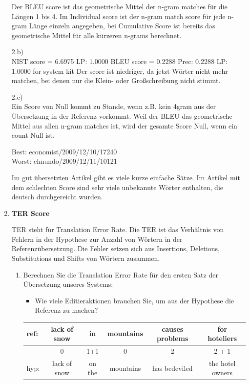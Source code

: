 \documentclass[12pt,fleqn]{article}
\begin{document}
\begin{enumerate}
Der BLEU score ist das geometrische Mittel der n-gram matches für die Längen 1 bis 4.
Im Individual score ist der n-gram match score für jede n-gram Länge einzeln angegeben, bei Cumulative Score ist bereits das geometrische Mittel für alle kürzeren n-grams berechnet.

\vspace{0.5cm} 
2.b) \\
NIST score = 6.6975 LP: 1.0000 BLEU score = 0.2288 Prec: 0.2288 LP: 1.0000 for system kit
Der score ist niedriger, da jetzt Wörter nicht mehr matchen, bei denen nur die Klein- oder Großschreibung nicht stimmt.

\vspace{0.5cm} 
2.c)\\
Ein Score von Null kommt zu Stande, wenn z.B. kein 4gram aus der Übersetzung in der Referenz vorkommt. Weil der BLEU das geometrische Mittel aus allen n-gram matches ist, wird der gesamte Score Null, wenn ein count Null ist.

Best:    economist/2009/12/10/17240 \\
Worst:  elmundo/2009/12/11/10121

Im gut übersetzten Artikel gibt es viele kurze einfache Sätze.
Im Artikel mit dem schlechten Score sind sehr viele unbekannte Wörter enthalten, die deutsch durchgereicht wurden. 


\vspace{0.5cm} 
\item \textbf{TER Score} 

\vspace{0.5cm} 
TER steht für Translation Error Rate. Die TER ist das Verhältnis von Fehlern in der Hypothese zur Anzahl von Wörtern in der Referenzübersetzung. Die Fehler setzen sich aus Insertions, Deletions, Substitutions und Shifts von Wörtern zusammen.

\vspace{0.5cm} 
\begin{enumerate} 
\item Berechnen Sie die Translation Error Rate für den ersten Satz der Übersetzung unseres Systems:


\vspace{0.5cm} 
\begin{itemize} 
 \item Wie viele Editieraktionen brauchen Sie, um aus der Hypothese die Referenz zu machen?
\end{itemize}

\begin{table}[h] 
 \begin{center} 
\begin{tabular}{|l|c|c|c|c|c|} \hline 
ref: & lack of snow & in & mountains & causes problems & for hoteliers \\  \hline 
& 0& 1+1  & 0  &2  &2 + 1   \\ \hline 
hyp: & lack of snow & on the & mountains & has bedeviled & the hotel owners \\ \hline 
\end{tabular}
 \end{center}
\end{table}


\end{enumerate}
\end{enumerate}
\end{document}

